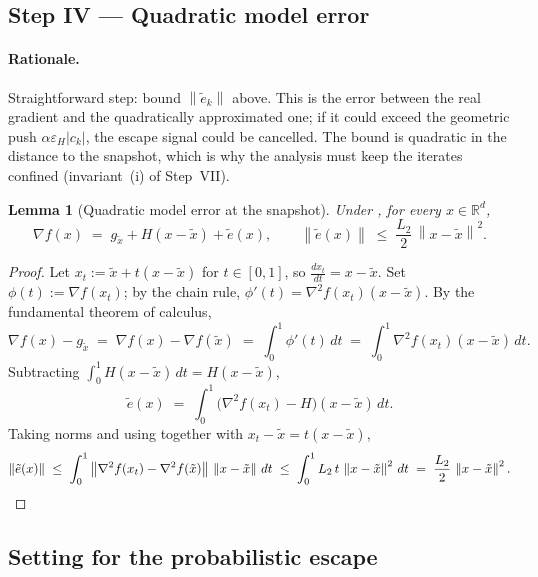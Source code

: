 \documentclass[11pt,a4paper]{article}
\theoremstyle{plain}
\newtheorem{lemma}{Lemma}
\theoremstyle{definition}
\newcommand{\R}{\mathbb{R}}
\newcommand{\norm}[1]{\left\|#1\right\|}
\newcommand{\eps}{\varepsilon}
\newcommand{\epsH}{\eps_{H}}
\newcommand{\grad}{\nabla}
\newcommand{\hess}{\nabla^{2}}
\newcommand{\Ltwo}{L_{2}}
\newcommand{\snap}{\tilde{x}}
\begin{document}
\subsection{Step IV --- Quadratic model error}\label{sub:graderror-section}

\paragraph{Rationale.}
Straightforward step: bound $\norm{\tilde e_{k}}$ above. This is the error between
the real gradient and the quadratically approximated one; if it could exceed the
geometric push $\alpha\epsH|c_{k}|$, the escape signal could be cancelled. The
bound is quadratic in the distance to the snapshot, which is why the analysis
must keep the iterates confined (invariant~(i) of Step~VII).

\begin{lemma}[Quadratic model error at the snapshot]\label{lem:graderror}
Under , for every $x\in\R^{d}$,
\begin{equation}\label{eq:graderror-snap}
\grad f(x) \;=\; g_{\snap} + H(x-\snap) + \tilde e(x),
\qquad
\norm{\tilde e(x)} \;\le\; \frac{\Ltwo}{2}\,\norm{x-\snap}^{2}.
\end{equation}
\end{lemma}

\begin{proof}
Let $x_{t}:=\snap+t(x-\snap)$ for $t\in[0,1]$, so $\frac{dx_{t}}{dt}=x-\snap$.
Set $\phi(t):=\grad f(x_{t})$; by the chain rule,
$\phi'(t)=\hess f(x_{t})(x-\snap)$. By the fundamental theorem of calculus,
\[
\grad f(x)-g_{\snap}
\;=\; \grad f(x)-\grad f(\snap)
\;=\; \int_{0}^{1}\phi'(t)\,dt
\;=\; \int_{0}^{1}\hess f(x_{t})(x-\snap)\,dt.
\]
Subtracting $\int_{0}^{1}H(x-\snap)\,dt = H(x-\snap)$,
\[
\tilde e(x)
\;=\; \int_{0}^{1}\bigl(\hess f(x_{t})-H\bigr)(x-\snap)\,dt.
\]
Taking norms and using  together with $x_{t}-\snap=t(x-\snap)$,
\[
\norm{\tilde e(x)}
\;\le\; \int_{0}^{1}\norm{\hess f(x_{t})-\hess f(\snap)}\,\norm{x-\snap}\,dt
\;\le\; \int_{0}^{1}\Ltwo\,t\,\norm{x-\snap}^{2}\,dt
\;=\; \frac{\Ltwo}{2}\,\norm{x-\snap}^{2}.
\qedhere
\]
\end{proof}

\subsection{Setting for the probabilistic escape}\label{sub:setting}
\end{document}
